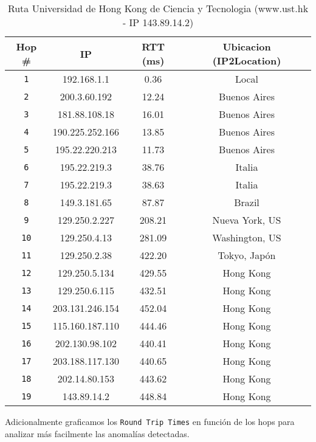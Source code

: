 \begin{table}[ht]\begin{center}
    \begin{tabular}{|c|c|c|c|}
    \hline
    \textbf{Hop \#} & \textbf{IP} & \textbf{RTT (ms)} & \textbf{Ubicacion (IP2Location)} \\ \hline
    \texttt{1} &  192.168.1.1 & 0.36 & Local \\ \hline
    \texttt{2} &  200.3.60.192 & 12.24 & Buenos Aires \\ \hline
    \texttt{3} &  181.88.108.18 & 16.01 & Buenos Aires \\ \hline
    \texttt{4} &  190.225.252.166 & 13.85 & Buenos Aires \\ \hline
    \texttt{5} &  195.22.220.213 & 11.73 & Buenos Aires \\ \hline
    \texttt{6} &  195.22.219.3 & 38.76 & Italia \\ \hline
    \texttt{7} &  195.22.219.3 & 38.63 & Italia \\ \hline
    \texttt{8} &  149.3.181.65 & 87.87 & Brazil \\ \hline
    \texttt{9} &  129.250.2.227 & 208.21 & Nueva York, US \\ \hline
    \texttt{10} & 129.250.4.13 & 281.09 & Washington, US \\ \hline
    \texttt{11} & 129.250.2.38 & 422.20 & Tokyo, Japón \\ \hline
    \texttt{12} & 129.250.5.134 & 429.55 & Hong Kong \\ \hline
    \texttt{13} & 129.250.6.115 & 432.51 & Hong Kong \\ \hline
    \texttt{14} & 203.131.246.154 & 452.04 & Hong Kong \\ \hline
    \texttt{15} & 115.160.187.110 & 444.46 & Hong Kong \\ \hline
    \texttt{16} & 202.130.98.102 & 440.41 & Hong Kong \\ \hline
    \texttt{17} & 203.188.117.130 & 440.65 & Hong Kong \\ \hline
    \texttt{18} & 202.14.80.153 & 443.62 & Hong Kong \\ \hline
    \texttt{19} & 143.89.14.2 & 448.84 & Hong Kong \\ \hline
    \end{tabular}
    \caption{Ruta Universidad de Hong Kong de Ciencia y Tecnologia (www.ust.hk  - IP 143.89.14.2)}
\end{center}
\end{table}

Adicionalmente graficamos los \texttt{Round Trip Times} en función de los hops para analizar más facilmente las anomalías detectadas.

